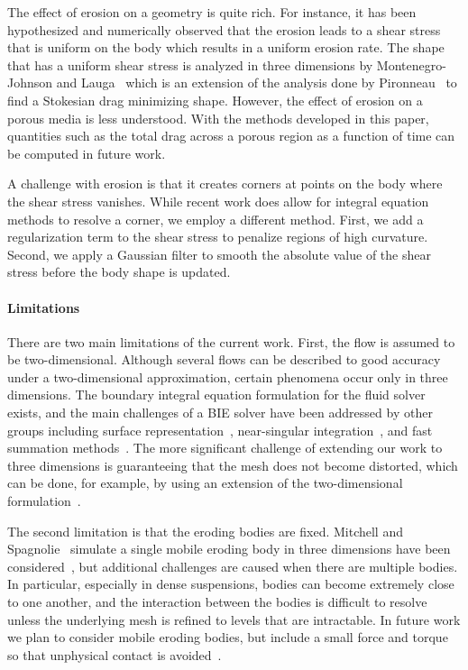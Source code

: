 \documentclass[preprint, 10pt]{elsarticle}
\begin{document}
The effect of erosion on a geometry is quite rich.  For instance, it has
been hypothesized and numerically observed that the erosion leads to a
shear stress that is uniform on the body which results in a uniform
erosion rate.  The shape that has a uniform shear stress is analyzed in
three dimensions by Montenegro-Johnson and Lauga~\cite{mon-lau2015}
which is an extension of the analysis done by Pironneau~\cite{pir1973}
to find a Stokesian drag minimizing shape.  However, the effect of
erosion on a porous media is less understood.  With the methods
developed in this paper, quantities such as the total drag across a
porous region as a function of time can be computed in future work.

A challenge with erosion is that it creates corners at points on the
body where the shear stress vanishes.  While recent work does allow for
integral equation methods to resolve a corner, we employ a different
method.  First, we add a regularization term to the shear stress to
penalize regions of high curvature.  Second, we apply a Gaussian filter
to smooth the absolute value of the shear stress before the body shape
is updated.


\paragraph{Limitations} There are two main limitations of the current
work.  First, the flow is assumed to be two-dimensional.  Although
several flows can be described to good accuracy under a two-dimensional
approximation, certain phenomena occur only in three dimensions.  The
boundary integral equation formulation for the fluid solver exists, and
the main challenges of a BIE solver have been addressed by other groups
including surface representation~\cite{yin-bir-zor2006,
vee-rah-bir-zor2011}, near-singular integration~\cite{yin-bir-zor2006,
kli-tor2016b}, and fast summation methods~\cite{yin-bir-zor2004,
ros-ols2015}.  The more significant challenge of extending our work to
three dimensions is guaranteeing that the mesh does not become
distorted, which can be done, for example, by using an extension of the
two-dimensional {\thL} formulation~\cite{amb-sie-tlu2013}.

The second limitation is that the eroding bodies are fixed.  Mitchell
and Spagnolie~\cite{mit-spa2016} simulate a single mobile eroding body
in three dimensions have been considered~\cite{mit-spa2016}, but
additional challenges are caused when there are multiple bodies. In
particular, especially in dense suspensions, bodies can become extremely
close to one another, and the interaction between the bodies is
difficult to resolve unless the underlying mesh is refined to levels
that are intractable. In future work we plan to consider mobile eroding
bodies, but include a small force and torque so that unphysical contact
is avoided~\cite{lu-rah-zor2017}.
\end{document}
